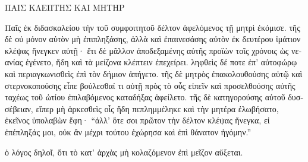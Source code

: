 \medskip

{\large
\begin{greek}
\noindent ΠΑΙΣ ΚΛΕΠΤΗΣ ΚΑΙ ΜΗΤΗΡ 

\medskip

\noindent Παῖς ἐκ διδασκαλείου τὴν τοῦ συμφοιτητοῦ δέλτον ἀφελόμενος τῇ μητρὶ ἐκόμισε. τῆς δὲ οὐ μόνον αὐτὸν μὴ ἐπιπληξάσης, ἀλλὰ καὶ ἐπαινεσάσης αὐτὸν ἐκ δευτέρου ἱμάτιον κλέψας ἤνεγκεν αὐτῇ· ἔτι δὲ μᾶλλον ἀποδεξαμένης αὐτῆς προϊὼν τοῖς χρόνοις ὡς νεανίας ἐγένετο, ἤδη καὶ τὰ μείζονα κλέπτειν  ἐπεχείρει. ληφθεὶς δέ ποτε ἐπ' αὐτοφώρῳ καὶ περιαγκωνισθεὶς ἐπὶ τὸν δήμιον ἀπήγετο. τῆς δὲ μητρὸς ἐπακολουθούσης αὐτῷ καὶ στερνοκοπούσης εἶπε βούλεσθαί τι αὐτῇ πρὸς τὸ οὖς εἰπεῖν καὶ προσελθούσης αὐτῆς ταχέως τοῦ ὠτίου ἐπιλαβόμενος καταδήξας ἀφείλετο. τῆς δὲ κατηγορούσης αὐτοῦ δυσσέβειαν, εἴπερ μὴ ἀρκεσθεὶς οἷς ἤδη πεπλημμέληκε καὶ τὴν μητέρα ἐλωβήσατο, ἐκεῖνος ὑπολαβὼν ἔφη· ``ἀλλ' ὅτε σοι πρῶτον τὴν δέλτον κλέψας ἤνεγκα, εἰ ἐπέπληξάς μοι, οὐκ ἂν μέχρι τούτου ἐχώρησα καὶ ἐπὶ θάνατον ἠγόμην.''

ὁ λόγος δηλοῖ, ὅτι τὸ κατ' ἀρχὰς μὴ κολαζόμενον ἐπὶ μεῖζον αὔξεται. 
\end{greek}

}

